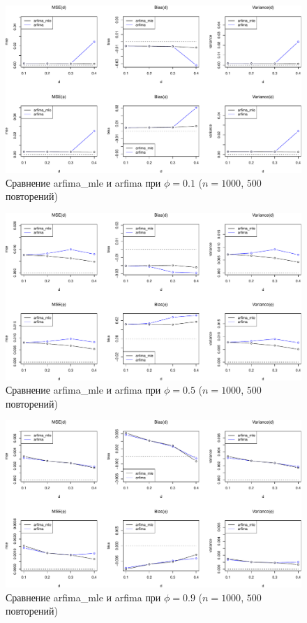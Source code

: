 \documentclass[specialist,
substylefile = spbu_report.rtx,
subf,href,colorlinks=true, 12pt]{disser}
\theoremstyle{definition}
\begin{document}
\begin{figure}[h]
	\centering
	\includegraphics[width=\textwidth]{img/arfi_est_phi1.pdf}
	\caption{Сравнение \textsf{arfima\_mle} и \textsf{arfima} при $\phi=0.1$ ($n=1000$, $500$ повторений)}
	\label{fig:mle_comparison_phi1}
\end{figure}

\begin{figure}[h]
	\centering
	\includegraphics[width=\textwidth]{img/arfi_est_phi5.pdf}
	\caption{Сравнение \textsf{arfima\_mle} и \textsf{arfima} при $\phi=0.5$ ($n=1000$, $500$ повторений)}
	\label{fig:mle_comparison_phi5}
\end{figure}

\begin{figure}[h]
	\centering
	\includegraphics[width=\textwidth]{img/arfi_est_phi9.pdf}
	\caption{Сравнение \textsf{arfima\_mle} и \textsf{arfima} при $\phi=0.9$ ($n=1000$, $500$ повторений)}
	\label{fig:mle_comparison_phi9}
\end{figure}
\end{document}
